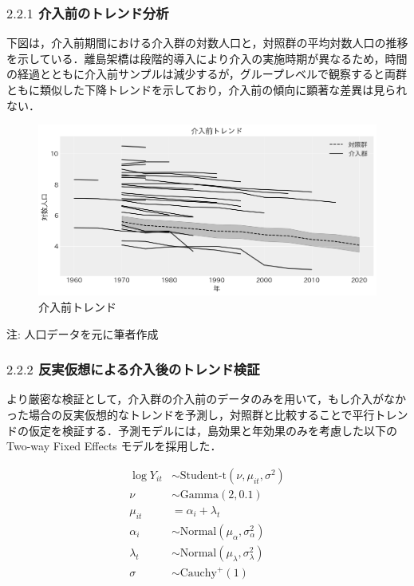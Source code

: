 \hypertarget{ux4ecbux5165ux524dux306eux30c8ux30ecux30f3ux30c9ux5206ux6790}{%
\subsubsection{\texorpdfstring{\(2.2.1\)
介入前のトレンド分析}{2.2.1 介入前のトレンド分析}}\label{ux4ecbux5165ux524dux306eux30c8ux30ecux30f3ux30c9ux5206ux6790}}

下図は，介入前期間における介入群の対数人口と，対照群の平均対数人口の推移を示している．離島架橋は段階的導入により介入の実施時期が異なるため，時間の経過とともに介入前サンプルは減少するが，グループレベルで観察すると両群ともに類似した下降トレンドを示しており，介入前の傾向に顕著な差異は見られない．

\begin{figure}
\centering
\includegraphics{../figures//pre_trend.png}
\caption{介入前トレンド}
\end{figure}

注: 人口データを元に筆者作成

\hypertarget{ux53cdux5b9fux4eeeux60f3ux306bux3088ux308bux4ecbux5165ux5f8cux306eux30c8ux30ecux30f3ux30c9ux691cux8a3c}{%
\subsubsection{\texorpdfstring{\(2.2.2\)
反実仮想による介入後のトレンド検証}{2.2.2 反実仮想による介入後のトレンド検証}}\label{ux53cdux5b9fux4eeeux60f3ux306bux3088ux308bux4ecbux5165ux5f8cux306eux30c8ux30ecux30f3ux30c9ux691cux8a3c}}

より厳密な検証として，介入群の介入前のデータのみを用いて，もし介入がなかった場合の反実仮想的なトレンドを予測し，対照群と比較することで平行トレンドの仮定を検証する．予測モデルには，島効果と年効果のみを考慮した以下の
Two-way Fixed Effects モデルを採用した．

\[
\begin{aligned}
\log{Y_{it}} &\sim \text{Student-t} (\nu, \mu_{it}, \sigma^2) \\
\nu &\sim \text{Gamma}(2, 0.1) \\
\mu_{it} &= \alpha_i + \lambda_t \\
\alpha_i &\sim \text{Normal}(\mu_{\alpha}, \sigma_{\alpha}^2) \\
\lambda_t &\sim \text{Normal}(\mu_{\lambda}, \sigma_{\lambda}^2) \\
\sigma &\sim \text{Cauchy}^+(1) \\
\end{aligned}
\]

